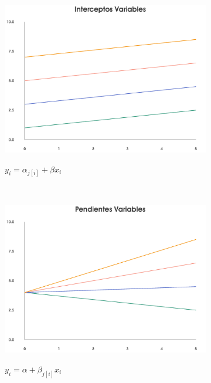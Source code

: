 \begin{figure}[h]
    \centering
    \begin{subfigure}{0.3\textwidth}
        \includegraphics[width=\textwidth]{Figs/Bayes/Interceptos_Variables}
        \label{fig:Ejemplos_Jer_Int_Var}
        \caption{$y_i = \alpha_{j[i]} + \beta x_i$}
    \end{subfigure}
    ~ 
    \begin{subfigure}{0.3\textwidth}
        \includegraphics[width=\textwidth]{Figs/Bayes/Pendientes_Variables}
        \label{fig:Ejemplos_Jer_Pend_Var}
        \caption{$y_i = \alpha + \beta_{j[i]} x_i$}
    \end{subfigure}
    ~
    \begin{subfigure}{0.3\textwidth}

\end{subfigure}
\end{figure}
